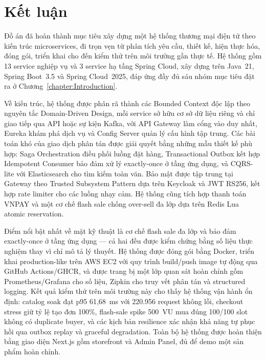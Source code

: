 \documentclass[../DoAn.tex]{subfiles}
\begin{document}
\section*{Kết luận}

Đồ án đã hoàn thành mục tiêu xây dựng một hệ thống thương mại điện tử theo kiến trúc
microservices, đi trọn vẹn từ phân tích yêu cầu, thiết kế, hiện thực hóa, đóng gói, triển khai
cho đến kiểm thử trên môi trường gần thực tế. Hệ thống gồm 13 service nghiệp vụ và 3 service hạ
tầng Spring Cloud, xây dựng trên Java~21, Spring Boot~3.5 và Spring Cloud~2025, đáp ứng đầy đủ
sáu nhóm mục tiêu đặt ra ở Chương~\ref{chapter:Introduction}.

Về kiến trúc, hệ thống được phân rã thành các Bounded Context độc lập theo nguyên tắc
Domain-Driven Design, mỗi service sở hữu cơ sở dữ liệu riêng và chỉ giao tiếp qua API hoặc sự
kiện Kafka, với API Gateway làm cổng vào duy nhất, Eureka khám phá dịch vụ và Config Server quản
lý cấu hình tập trung. Các bài toán khó của giao dịch phân tán được giải quyết bằng những mẫu
thiết kế phù hợp: Saga Orchestration điều phối luồng đặt hàng, Transactional Outbox kết hợp
Idempotent Consumer bảo đảm xử lý exactly-once ở tầng ứng dụng, và CQRS-lite với Elasticsearch
cho tìm kiếm toàn văn. Bảo mật được tập trung tại Gateway theo Trusted Subsystem Pattern dựa trên
Keycloak và JWT RS256, kết hợp rate limiter cho các luồng nhạy cảm. Hệ thống cũng tích hợp thanh
toán VNPAY và một cơ chế flash sale chống over-sell đa lớp dựa trên Redis Lua atomic reservation.

Điểm nổi bật nhất về mặt kỹ thuật là cơ chế flash sale đa lớp và bảo đảm exactly-once ở tầng ứng
dụng --- cả hai đều được kiểm chứng bằng số liệu thực nghiệm thay vì chỉ mô tả lý thuyết. Hệ
thống được đóng gói bằng Docker, triển khai production-like trên AWS EC2 với quy trình build/push
image tự động qua GitHub Actions/GHCR, và được trang bị một lớp quan sát hoàn chỉnh gồm
Prometheus/Grafana cho số liệu, Zipkin cho truy vết phân tán và structured logging. Kết quả kiểm
thử trên môi trường này cho thấy hệ thống vận hành ổn định: catalog soak đạt p95 61,68~ms với
220.956 request không lỗi, checkout stress giữ tỷ lệ tạo đơn 100\%, flash-sale spike 500~VU mua
đúng 100/100 slot không có duplicate buyer, và các kịch bản resilience xác nhận khả năng tự phục
hồi qua outbox replay và graceful degradation. Toàn bộ hệ thống được hoàn thiện bằng giao diện
Next.js gồm storefront và Admin Panel, đủ để demo một sản phẩm hoàn chỉnh.
\end{document}
